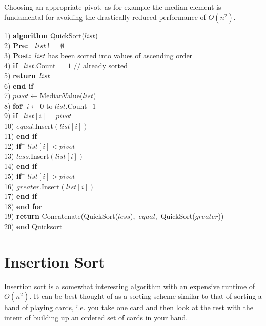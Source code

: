 Choosing an appropriate pivot, as for example the median element is fundamental for avoiding the drastically reduced performance of $O(n^{2})$.

\begin{tabbing}
1)  \textbf{alg}\= \textbf{orithm} QuickSort($list$) \\
2)  \> \textbf{Pre:}~~$list~!=~\emptyset$ \\
3)  \> \textbf{Post:}~$list$ has been sorted into values of ascending order \\
4)  \> \textbf{if}~\= $list$.Count $= 1$ // already sorted \\
5)  \> \> \textbf{return}~$list$ \\
6)  \> \textbf{end if} \\
7)  \> $pivot \leftarrow $MedianValue($list$) \\
8)  \> \textbf{for}\=~$i \leftarrow 0$ to $list$.Count$-1$ \\
9)  \> \> \textbf{if}~\= $list[i] = pivot$ \\
10) \> \> \> $equal$.Insert$(list[i])$\\
11) \> \> \textbf{end if} \\
12) \> \> \textbf{if}~\= $list[i] < pivot$ \\
13) \> \> \> $less$.Insert$(list[i])$\\
14) \> \> \textbf{end if} \\
15) \> \> \textbf{if}~\= $list[i] > pivot$ \\
16) \> \> \> $greater$.Insert$(list[i])$\\
17) \> \> \textbf{end if} \\
18) \> \textbf{end for} \\
19) \> \textbf{return} Concatenate(QuickSort($less$),~$equal$,~QuickSort($greater$)) \\
20) \textbf{end} Quicksort \\
\end{tabbing}

\newpage
\section{Insertion Sort} \label{shell_sort}
Insertion sort is a somewhat interesting algorithm with an expensive runtime of $O(n^{2})$. It can be best thought of as a sorting scheme similar to that of sorting a hand of playing cards, i.e. you take one card and then look at the rest with the intent of building up an ordered set of cards in your hand.

